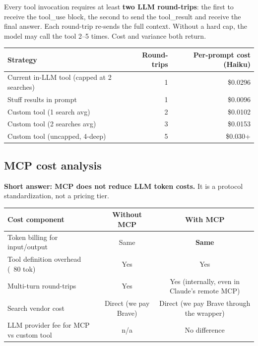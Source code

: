 \documentclass[11pt,letterpaper]{article}
\begin{document}
Every tool invocation requires at least \textbf{two LLM round-trips}: the
first to receive the tool\_use block, the second to send the tool\_result
and receive the final answer. Each round-trip re-sends the full context.
Without a hard cap, the model may call the tool 2--5 times. Cost and
variance both return.

\begin{center}
\begin{tabular}{@{}lrr@{}}
\toprule
\textbf{Strategy} & \textbf{Round-trips} & \textbf{Per-prompt cost (Haiku)} \\
\midrule
Current in-LLM tool (capped at 2 searches) & 1 & \$0.0296 \\
Stuff results in prompt                    & 1 & \$0.0096 \\
Custom tool (1 search avg)                 & 2 & \$0.0102 \\
Custom tool (2 searches avg)               & 3 & \$0.0153 \\
Custom tool (uncapped, 4-deep)             & 5 & \$0.030+ \\
\bottomrule
\end{tabular}
\end{center}

\subsection{MCP cost analysis}

\textbf{Short answer: MCP does not reduce LLM token costs.} It is a protocol
standardization, not a pricing tier.

\begin{center}
\begin{tabular}{@{}lcc@{}}
\toprule
\textbf{Cost component} & \textbf{Without MCP} & \textbf{With MCP} \\
\midrule
Token billing for input/output     & Same & \textbf{Same} \\
Tool definition overhead (~80 tok) & Yes  & Yes \\
Multi-turn round-trips             & Yes  & Yes (internally, even in Claude's remote MCP) \\
Search vendor cost                 & Direct (we pay Brave) & Direct (we pay Brave through the wrapper) \\
LLM provider fee for MCP vs custom tool & n/a & No difference \\
\bottomrule
\end{tabular}
\end{center}
\end{document}
